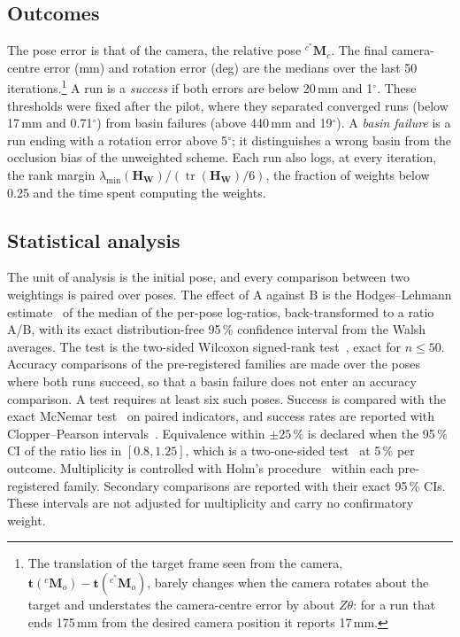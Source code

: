\documentclass[preprint,12pt]{elsarticle}
\theoremstyle{remark}
\newcommand{\HW}{\mathbf{H}_{\mathbf{W}}}
\newcommand{\tr}{\operatorname{tr}}
\begin{document}
\subsection{Outcomes}
The pose error is that of the camera, the relative pose
${}^{c^{*}}\mathbf{M}_{c}$. The final camera-centre error (mm) and rotation
error (deg) are the medians over the last 50 iterations.\footnote{The
translation of the target frame seen from the camera,
$\mathbf{t}({}^{c}\mathbf{M}_{o})-\mathbf{t}({}^{c^{*}}\mathbf{M}_{o})$, barely
changes when the camera rotates about the target and understates the
camera-centre error by about $Z\theta$: for a run that ends 175\,mm from the
desired camera position it reports 17\,mm.} A run is a \emph{success} if both
errors are below 20\,mm and 1$^{\circ}$. These thresholds were fixed after
the pilot, where they separated converged runs (below 17\,mm and
0.71$^{\circ}$) from basin failures (above 440\,mm and 19$^{\circ}$). A
\emph{basin failure} is a run ending with a rotation error above 5$^{\circ}$; it
distinguishes a wrong basin from the occlusion bias of the unweighted scheme.
Each run also logs, at every iteration, the rank margin
$\lambda_{\min}(\HW)/(\tr(\HW)/6)$, the fraction of weights below 0.25 and
the time spent computing the weights.

\subsection{Statistical analysis}
The unit of analysis is the initial pose, and every comparison between two
weightings is paired over poses. The effect of A against B is the
Hodges--Lehmann estimate~\cite{hodges1963} of the median of the per-pose
log-ratios, back-transformed to a ratio A/B, with its exact distribution-free
95\,\% confidence interval from the Walsh averages. The test is the two-sided
Wilcoxon signed-rank test~\cite{wilcoxon1945}, exact for $n\le50$. Accuracy
comparisons of the pre-registered families are made over the poses where both
runs succeed, so that a basin failure does not enter an accuracy comparison. A test
requires at least six such poses. Success is compared with the exact McNemar
test~\cite{mcnemar1947} on paired indicators, and success rates are reported
with Clopper--Pearson intervals~\cite{clopper1934}. Equivalence within
$\pm25\,\%$ is declared when the 95\,\% CI of the ratio lies in $[0.8,1.25]$,
which is a two-one-sided test~\cite{schuirmann1987tost} at 5\,\% per outcome.
Multiplicity is controlled with Holm's procedure~\cite{holm1979} within each
pre-registered family. Secondary comparisons are reported with their exact
95\,\% CIs. These intervals are not adjusted for multiplicity and carry no
confirmatory weight.
\end{document}
